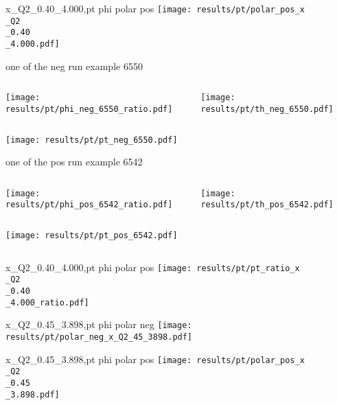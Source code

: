 \begin{frame}{x\_Q2\_0.40\_4.000,pt phi polar pos}
\texttt{[image: results/pt/polar\_pos\_x\\\_Q2\\\_0.40\\\_4.000.pdf]}
\end{frame}
\begin{frame}{one of the neg run example 6550}
\begin{columns}
\begin{column}[T]{0.5\textwidth}
\texttt{[image: results/pt/phi\_neg\_6550\_ratio.pdf]}
\end{column}
\begin{column}[T]{0.5\textwidth}
\texttt{[image: results/pt/th\_neg\_6550.pdf]}
\end{column}
\end{columns}
\texttt{[image: results/pt/pt\_neg\_6550.pdf]}
\end{frame}
\begin{frame}{one of the pos run example 6542}
\begin{columns}
\begin{column}[T]{0.5\textwidth}
\texttt{[image: results/pt/phi\_pos\_6542\_ratio.pdf]}
\end{column}
\begin{column}[T]{0.5\textwidth}
\texttt{[image: results/pt/th\_pos\_6542.pdf]}
\end{column}
\end{columns}
\begin{columns}
\begin{column}[T]{0.5\textwidth}
\texttt{[image: results/pt/pt\_pos\_6542.pdf]}
\end{column}
\begin{column}[T]{0.5\textwidth}
\end{column}
\end{columns}
\end{frame}
\begin{frame}{x\_Q2\_0.40\_4.000,pt phi polar pos}
\texttt{[image: results/pt/pt\_ratio\_x\\\_Q2\\\_0.40\\\_4.000\_ratio.pdf]}
\end{frame}
\begin{frame}{x\_Q2\_0.45\_3.898,pt phi polar neg}
\texttt{[image: results/pt/polar\_neg\_x\_Q2\_45\_3898.pdf]}
\end{frame}
\begin{frame}{x\_Q2\_0.45\_3.898,pt phi polar pos}
\texttt{[image: results/pt/polar\_pos\_x\\\_Q2\\\_0.45\\\_3.898.pdf]}
\end{frame}
